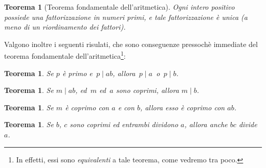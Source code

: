 \documentclass[pdflatex,11pt,a4paper,oneside]{article}
\newcommand{\TFA}{teorema fondamentale dell'aritmetica}
\newcommand{\divides}[0]{\mid}
\newtheorem{theorem}[TheoremLike]{Teorema}
\begin{document}
\begin{theorem}[Teorema fondamentale dell'aritmetica]
Ogni intero positivo possiede una fattorizzazione in numeri primi, e
tale fattorizzazione \`e unica (a meno di un riordinamento dei fattori).
\end{theorem}

Valgono inoltre i seguenti risulati, che sono conseguenze pressoch\`e
immediate del \TFA\footnote{In effetti, essi sono \emph{equivalenti}
a tale teorema, come vedremo tra poco.}:

\begin{theorem}\label{thm:TFA-div-p}
Se $p$ \`e primo e \,$p \divides ab$, allora \,$p \divides a$\, o
\,$p \divides b$.
\end{theorem}

\begin{theorem}\label{thm:TFA-div}
Se $m \divides ab$, ed\, $m$ ed\, $a$ sono coprimi, allora $m \divides b$.
\end{theorem}

\begin{theorem}\label{thm:TFA-mul-1}
Se $m$ \`e coprimo con $a$ e con $b$, allora esso \`e coprimo con $ab$.
\end{theorem}

\begin{theorem}\label{thm:TFA-mul-2}
Se $b$, $c$ sono coprimi ed entrambi dividono $a$, allora
anche $bc$ divide $a$.
\end{theorem}
\end{document}
